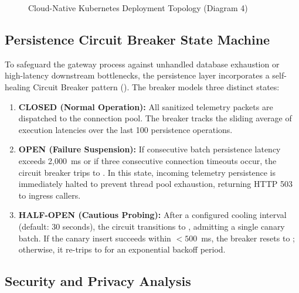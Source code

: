 \documentclass[a4paper]{article}
\begin{document}
\begin{figure}[H]
{%
}
\caption{Cloud-Native Kubernetes Deployment Topology (Diagram 4)}
\label{fig:deployment_architecture}
\end{figure}

\subsection{Persistence Circuit Breaker State Machine}
To safeguard the gateway process against unhandled database exhaustion or high-latency downstream bottlenecks, the persistence layer incorporates a self-healing Circuit Breaker pattern (). The breaker models three distinct states:
\begin{enumerate}
    \item \textbf{CLOSED (Normal Operation):} All sanitized telemetry packets are dispatched to the  connection pool. The breaker tracks the sliding average of execution latencies over the last 100 persistence operations.
    \item \textbf{OPEN (Failure Suspension):} If consecutive batch persistence latency exceeds 2,000~ms or if three consecutive connection timeouts occur, the circuit breaker trips to . In this state, incoming telemetry persistence is immediately halted to prevent thread pool exhaustion, returning HTTP 503 to ingress callers.
    \item \textbf{HALF-OPEN (Cautious Probing):} After a configured cooling interval (default: 30 seconds), the circuit transitions to , admitting a single canary batch. If the canary insert succeeds within $< 500$~ms, the breaker resets to ; otherwise, it re-trips to  for an exponential backoff period.
\end{enumerate}

\subsection{Security and Privacy Analysis}
\end{document}
